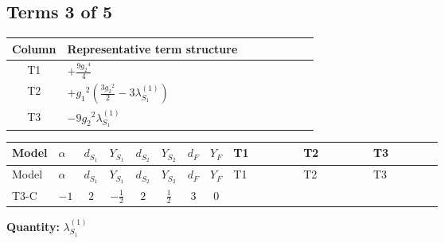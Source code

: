 \documentclass[8pt]{article}
\begin{document}
\begin{landscape}
\subsection*{Terms 3 of 5}
\begin{center}
\begin{tabular}{@{}c >{\raggedright\arraybackslash}p{0.82\linewidth}@{}}
\toprule
Column & Representative term structure \\
\midrule
T1 & \(\displaystyle +\frac{9 {g_2}^4}{4}\) \\
\midrule
T2 & \(\displaystyle +{g_1}^2 \left(\frac{3 {g_2}^2}{2}-3 {\lambda_{S_1}^{(1)}}\right)\) \\
\midrule
T3 & \(\displaystyle -9 {g_2}^2 {\lambda_{S_1}^{(1)}}\) \\
\midrule
\bottomrule
\end{tabular}
\end{center}
\smallskip
\tiny
\begin{longtable}{@{}llcccccc >{\raggedright\arraybackslash}p{0.21\linewidth} >{\raggedright\arraybackslash}p{0.21\linewidth} >{\raggedright\arraybackslash}p{0.21\linewidth}@{}}
\toprule
Model & $\alpha$ & $d_{S_1}$ & $Y_{S_1}$ & $d_{S_2}$ & $Y_{S_2}$ & $d_F$ & $Y_F$ & T1 & T2 & T3 \\
\midrule
\endfirsthead
\toprule
Model & $\alpha$ & $d_{S_1}$ & $Y_{S_1}$ & $d_{S_2}$ & $Y_{S_2}$ & $d_F$ & $Y_F$ & T1 & T2 & T3 \\
\midrule
\endhead
T3-C & $-1$ & $2$ & $-\frac{1}{2}$ & $2$ & $\frac{1}{2}$ & $3$ & $0$ & \scriptsize\adjustbox{max width=\linewidth}{$\begin{gathered} +\frac{9 {g_2}^4}{4}\end{gathered}$} & \scriptsize\adjustbox{max width=\linewidth}{$\begin{gathered} +{g_1}^2 \left(\frac{3 {g_2}^2}{2}-3 {\lambda_{S_1}^{(1)}}\right)\end{gathered}$} & \scriptsize\adjustbox{max width=\linewidth}{$\begin{gathered} -9 {g_2}^2 {\lambda_{S_1}^{(1)}}\end{gathered}$} \\
\midrule
\bottomrule
\end{longtable}
\clearpage
\noindent\textbf{Quantity: }$\lambda_{S_1}^{(1)}$\par\smallskip

\end{landscape}
\end{document}
